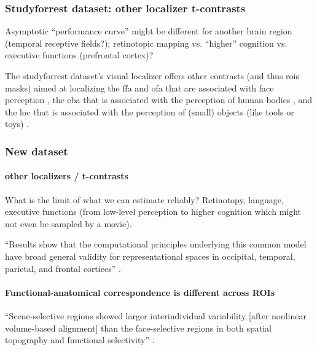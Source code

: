 \subsubsection{Studyforrest dataset: other localizer t-contrasts}


%
Asymptotic ``performance curve'' might be different for another brain region
(temporal receptive fields?); retinotopic mapping vs. ``higher'' cognition  vs.
executive functions (prefrontal cortex)?


The studyforrest dataset's visual localizer \citep{sengupta2016extension} offers
other contrasts (and thus \acp{roi} masks) aimed at localizing the \ac{ffa} and
\ac{ofa} that are associated with face perception \citep{kanwisher1997ffa,
pitcher2011occipitalfacearea}, the \ac{eba} that is associated with the
perception of human bodies \citep{downing2001bodyarea}, and the \ac{loc} that is
associated with the perception of (small) objects (like tools or toys)
\citep{malach1995loc}.



\subsubsection{New dataset}

\paragraph{other localizers / t-contrasts}

What is the limit of what we can estimate reliably?
%
Retinotopy, language, executive functions (from low-level perception to higher
cognition which might not even be sampled by a movie).

``Results show that the computational principles underlying this common
model have broad general validity for representational spaces in occipital,
temporal, parietal, and frontal cortices'' \citep{guntupalli2016model}.


\paragraph{Functional-anatomical correspondence is different across ROIs}

``Scene-selective regions showed larger interindividual variability [after
nonlinear volume-based alignment] than the face-selective regions in both
spatial topography and functional selectivity'' \citet{zhen2017quantifying}.


